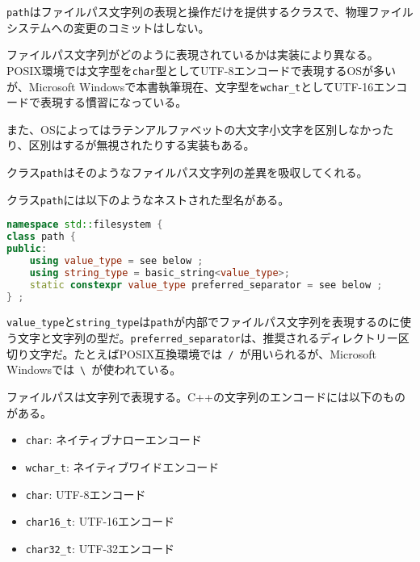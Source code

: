 \lstinline!path!はファイルパス文字列の表現と操作だけを提供するクラスで、物理ファイルシステムへの変更のコミットはしない。

ファイルパス文字列がどのように表現されているかは実装により異なる。POSIX環境では文字型を\lstinline!char!型としてUTF-8エンコードで表現するOSが多いが、Microsoft
Windowsで本書執筆現在、文字型を\lstinline!wchar_t!としてUTF-16エンコードで表現する慣習になっている。

また、OSによってはラテンアルファベットの大文字小文字を区別しなかったり、区別はするが無視されたりする実装もある。

クラス\lstinline!path!はそのようなファイルパス文字列の差異を吸収してくれる。

クラス\lstinline!path!には以下のようなネストされた型名がある。

\begin{lstlisting}[language=C++]
namespace std::filesystem {
class path {
public:
    using value_type = see below ;
    using string_type = basic_string<value_type>;
    static constexpr value_type preferred_separator = see below ;
} ;
\end{lstlisting}

\lstinline!value_type!と\lstinline!string_type!は\lstinline!path!が内部でファイルパス文字列を表現するのに使う文字と文字列の型だ。\lstinline!preferred_separator!は、推奨されるディレクトリー区切り文字だ。たとえばPOSIX互換環境では~\lstinline!/!~が用いられるが、Microsoft
Windowsでは~\lstinline!\!~が使われている。

%

ファイルパスは文字列で表現する。C++の文字列のエンコードには以下のものがある。

\begin{itemize}
\itemsep1pt\parskip0pt
\item
  \lstinline!char!: ネイティブナローエンコード
\item
  \lstinline!wchar_t!: ネイティブワイドエンコード
\item
  \lstinline!char!: UTF-8エンコード
\item
  \lstinline!char16_t!: UTF-16エンコード
\item
  \lstinline!char32_t!: UTF-32エンコード
\end{itemize}

